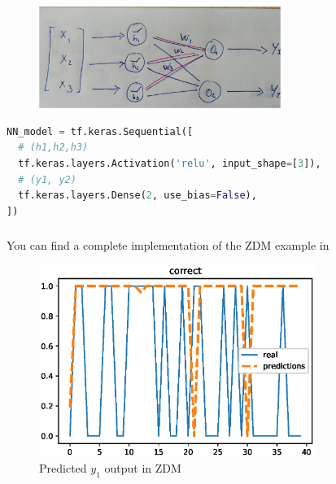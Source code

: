 \documentclass{beamer}
\begin{document}
\begin{frame}[fragile]
    \frametitle{\insertsection}
    \begin{figure}
        \centering
        \includegraphics[width=0.7\textwidth]{img/nn-relu.jpg}
        \caption{}
        \label{fig:nn-relu2}
    \end{figure}

        \begin{lstlisting}[language=Python]
NN_model = tf.keras.Sequential([
  # (h1,h2,h3)
  tf.keras.layers.Activation('relu', input_shape=[3]),
  # (y1, y2)
  tf.keras.layers.Dense(2, use_bias=False),  
])\end{lstlisting}

\end{frame}


\begin{frame}
    \frametitle{\insertsection}
    You can find a complete implementation of the ZDM example in \href{https://github.com/MartinPJorge/nn-intro-slides}{}
    \vfill
    \begin{figure}
        \centering
        \includegraphics[width=0.8\textwidth]{img/correct.eps}
        \caption{Predicted $y_1$ output in ZDM}
        \label{fig:nn-relu2}
    \end{figure}
\end{frame}
\end{document}
